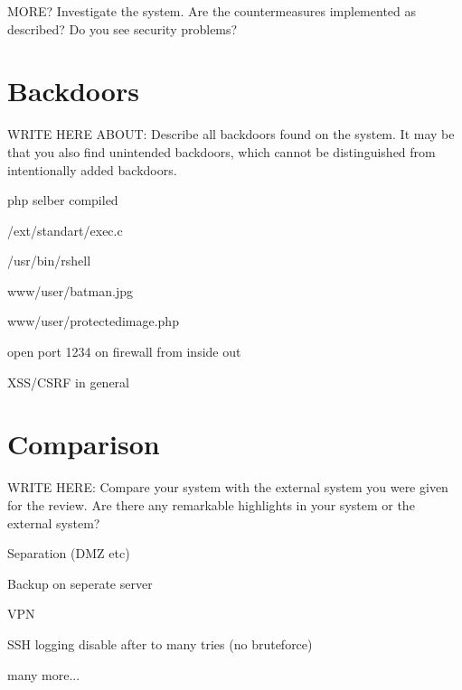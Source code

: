 \documentclass{report}
\begin{document}
MORE? Investigate the system. Are the countermeasures implemented as described? Do you see security problems?


\section{Backdoors}

WRITE HERE ABOUT: 
Describe all backdoors found on the system. 
It may be that you also find unintended backdoors, which cannot be distinguished from intentionally added backdoors.


php selber compiled


/ext/standart/exec.c


/usr/bin/rshell


www/user/batman.jpg


www/user/protectedimage.php


open port 1234 on firewall from inside out


XSS/CSRF in general


\section{Comparison}

WRITE HERE: Compare your system with the external system you were given for the
review.   Are there any remarkable highlights in your system or the external system?


Separation (DMZ etc)


Backup on seperate server


VPN


SSH logging disable after to many tries (no bruteforce)


many more...
\end{document}
